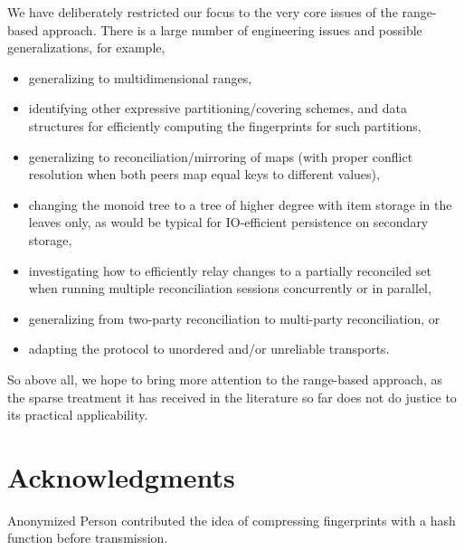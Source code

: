 \documentclass[conference]{IEEEtran}
\begin{document}
We have deliberately restricted our focus to the very core issues of the range-based approach. There is a large number of engineering issues and possible generalizations, for example,

\begin{itemize}
	\item generalizing to multidimensional ranges,
	\item identifying other expressive partitioning/covering schemes, and data structures for efficiently computing the fingerprints for such partitions,
	\item generalizing to reconciliation/mirroring of maps (with proper conflict resolution when both peers map equal keys to different values),
	\item changing the monoid tree to a tree of higher degree with item storage in the leaves only, as would be typical for IO-efficient persistence on secondary storage,
	\item investigating how to efficiently relay changes to a partially reconciled set when running multiple reconciliation sessions concurrently or in parallel,
	\item generalizing from two-party reconciliation to multi-party reconciliation, or
	\item adapting the protocol to unordered and/or unreliable transports.
\end{itemize}

So above all, we hope to bring more attention to the range-based approach, as the sparse treatment it has received in the literature so far does not do justice to its practical applicability.

\section{Acknowledgments}

Anonymized Person
 contributed the idea of compressing fingerprints with a hash function before transmission.



\end{document}
